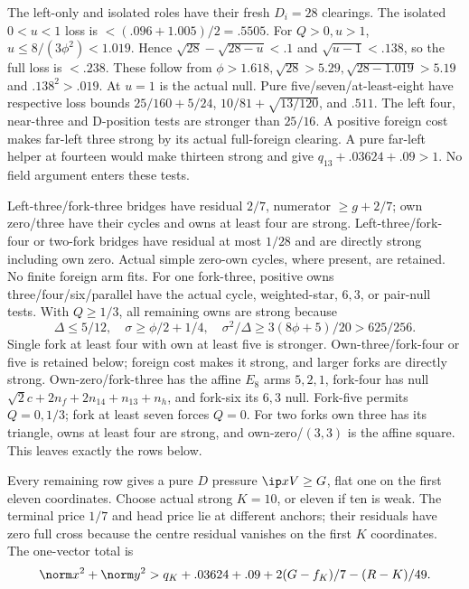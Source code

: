 The left-only and isolated roles have their fresh \(D_i=28\)
clearings. The isolated \(0<u<1\) loss is
\(<(.096+1.005)/2=.5505\). For \(Q>0,u>1\),
\(u\le8/(3\phi^2)<1.019\). Hence
\(\sqrt{28}-\sqrt{28-u}<.1\) and \(\sqrt{u-1}<.138\),
so the full loss is \(<.238\). These follow from
\(\phi>1.618,\sqrt{28}>5.29,\sqrt{28-1.019}>5.19\) and
\(.138^2>.019\). At \(u=1\) is the actual null. Pure five/seven/at-least-eight have respective
loss bounds \(25/160+5/24\), \(10/81+\sqrt{13/120}\),
and \(.511\). The left four, near-three and D-position tests
are stronger than \(25/16\). A positive foreign cost makes
far-left three strong by its actual full-foreign clearing. A pure
far-left helper at fourteen would make thirteen strong and give
\(q_{13}+.03624+.09>1\). No field argument enters these tests.

Left-three/fork-three bridges have residual \(2/7\), numerator
\(\ge g+2/7\); own zero/three have their cycles and owns at
least four are strong. Left-three/fork-four or two-fork bridges
have residual at most \(1/28\) and are directly strong including
own zero. Actual simple zero-own cycles, where present, are retained. No finite foreign arm fits.
For one fork-three, positive owns three/four/six/parallel have
the actual cycle, weighted-star, \(6,3\), or pair-null tests.
With \(Q\ge1/3\), all remaining owns are strong because
\[
 \Delta\le5/12,\quad \sigma\ge\phi/2+1/4,\quad
 \sigma^2/\Delta\ge3(8\phi+5)/20>625/256.
\]
Single fork at least four with own at least five is stronger.
Own-three/fork-four or five is retained below; foreign cost makes
it strong, and larger forks are directly strong. Own-zero/fork-three
has the affine \(E_8\) arms \(5,2,1\), fork-four has null
\(\sqrt2c+2n_f+2n_{14}+n_{13}+n_h\), and fork-six its
\(6,3\) null. Fork-five permits \(Q=0,1/3\); fork at least
seven forces \(Q=0\). For two forks own three has its triangle,
owns at least four are strong, and own-zero/\((3,3)\) is the
affine square. This leaves exactly the rows below.

Every remaining row gives a pure \(D\) pressure \(\ip xV\ge G\),
flat one on the first eleven coordinates. Choose actual strong
\(K=10\), or eleven if ten is weak. The terminal price \(1/7\)
and head price lie at different anchors; their residuals have
zero full cross because the centre residual vanishes on the
first \(K\) coordinates. The one-vector total is
\begin{equation}\label{eq:D16typedcentre}
 \norm x^2+\norm y^2>
 q_K+.03624+.09+2(G-f_K)/7-(R-K)/49.
\end{equation}

